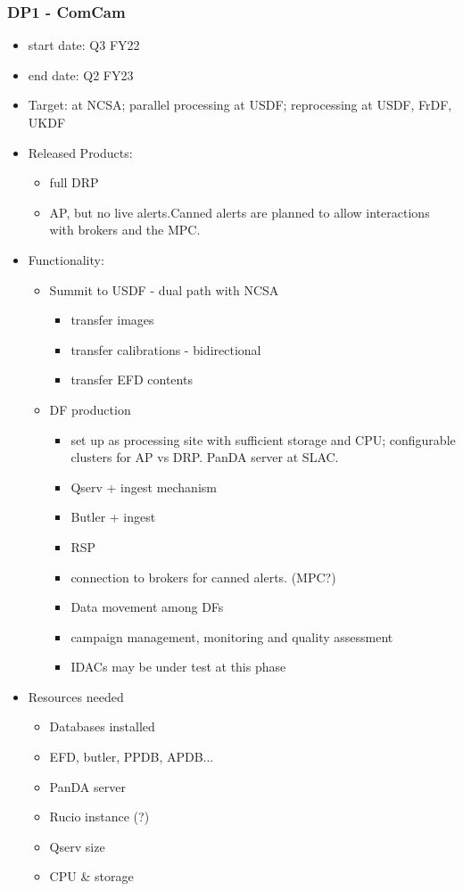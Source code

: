 \subsubsection{ \gls{DP1} - ComCam}
\begin{itemize}
\item start date: Q3 \gls{FY22}
\item end date: Q2 \gls{FY23}
\item Target: at \gls{NCSA}; parallel processing at USDF; reprocessing at USDF, FrDF, UKDF
\item Released Products:
\begin{itemize}
\item full \gls{DRP}
\item \gls{AP}, but no live alerts.Canned alerts are planned to allow
  interactions with brokers and the \gls{MPC}.
\end{itemize}
\item Functionality:
\begin{itemize}
\item \gls{Summit} to \gls{USDF}  - dual path with NCSA
\begin{itemize}
\item transfer images
\item transfer calibrations - bidirectional
\item transfer \gls{EFD} contents
\end{itemize}
\item \gls{DF} production
\begin{itemize}
\item set up as processing site with sufficient storage and \gls{CPU};
  configurable clusters for AP vs DRP. PanDA server at \gls{SLAC}.
\item \gls{Qserv} + ingest mechanism
\item \gls{Butler} + ingest
\item \gls{RSP}
\item connection to brokers for canned alerts. (\gls{MPC}?)
\item Data movement among DFs
\item campaign management, \gls{monitoring} and quality assessment
\item IDACs may be under test at this phase
\end{itemize}
\end{itemize}
\item Resources needed
\begin{itemize}
\item Databases installed
\item \gls{EFD}, butler, \gls{PPDB}, APDB...
\item \gls{PanDA} server
\item \gls{Rucio} instance (?)
\item \gls{Qserv} size
\item \gls{CPU} \& storage
\end{itemize}
\end{itemize}
